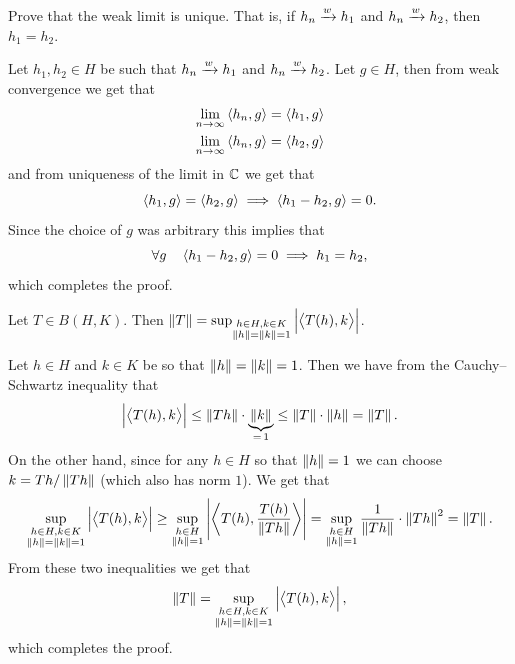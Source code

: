 \documentclass[11pt,a4paper]{article}
\begin{document}
\begin{exercise}
  Prove that the weak limit is unique.
  That is, if $h_n \xrightarrow{w} h_1$ and $h_n \xrightarrow{w} h_2$,
  then $h_1 = h_2$.
\end{exercise}
\begin{solution}
  Let $h_1,h_2 \in H$ be
  such that $h_n \xrightarrow{w} h_1$ and $h_n \xrightarrow{w} h_2$.
  Let $g \in H$, then from weak convergence we get that
  \begin{gather*}
    \lim_{n \to \infty} \left\langle h_n, g \right\rangle = \left\langle h_1, g \right\rangle \\
    \lim_{n \to \infty} \left\langle h_n, g \right\rangle = \left\langle h_2, g \right\rangle
  \end{gather*}
  and from uniqueness of the limit in $\mathbb{C}$ we get that
  \[
    \left\langle h_1, g \right\rangle = \left\langle h_2, g \right\rangle \implies
    \left\langle h_1 - h_2, g \right\rangle = 0.
  \]
  Since the choice of $g$ was arbitrary this implies that
  \[
    \forall g \quad \left\langle h_1 - h_2, g \right\rangle = 0 \implies h_1 = h_2,
  \]
  which completes the proof.
\end{solution}

\begin{exercise}
  Let $T \in B(H,K)$.
  Then $\left\lVert T\right\rVert = \sup_{\substack{h \in H,k \in K \\
  \left\lVert h\right\rVert = \left\lVert k\right\rVert = 1}} \left\lvert\left\langle T(h), k \right\rangle\right\rvert$.
\end{exercise}
\begin{solution}
  Let $h \in H$ and $k \in K$ be so that $\left\lVert h\right\rVert = \left\lVert k\right\rVert = 1$.
  Then we have from the Cauchy--Schwartz inequality that
  \[
    \left\lvert\left\langle T(h), k \right\rangle\right\rvert \le
    \left\lVert Th\right\rVert \cdot \underbrace{\left\lVert k\right\rVert}_{=\,1} \le
    \left\lVert T\right\rVert \cdot \left\lVert h\right\rVert = \left\lVert T\right\rVert.
  \]
  On the other hand, since for any $h \in H$ so that $\left\lVert h\right\rVert = 1$
  we can choose $k = Th / \left\lVert Th\right\rVert$ (which also has norm $1$).
  We get that
  \[
    \sup_{\substack{h \in H,k \in K \\
      \left\lVert h\right\rVert = \left\lVert k\right\rVert = 1}} \left\lvert\left\langle T(h), k \right\rangle\right\rvert \geq
    \sup_{\substack{h \in H \\ \left\lVert h\right\rVert = 1}}
      \left\lvert\left\langle T(h), \frac{T(h)}{\left\lVert Th\right\rVert} \right\rangle\right\rvert =
    \sup_{\substack{h \in H \\ \left\lVert h\right\rVert = 1}}
    \frac{1}{\left\lVert Th\right\rVert} \cdot \left\lVert Th\right\rVert^2 = \left\lVert T\right\rVert. 
  \]
  From these two inequalities we get that
  \[
    \left\lVert T\right\rVert = \sup_{\substack{h \in H,k \in K \\
    \left\lVert h\right\rVert = \left\lVert k\right\rVert = 1}} \left\lvert\left\langle T(h), k \right\rangle\right\rvert,
  \]
  which completes the proof.
\end{solution}
\end{document}
